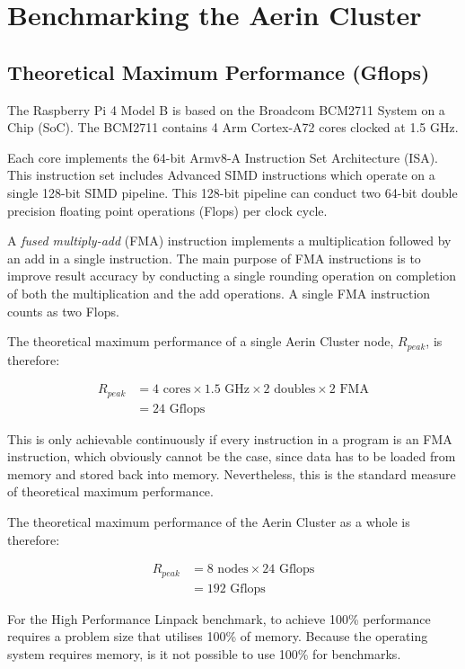 \documentclass{report}
\begin{document}
%
%
\chapter{Benchmarking the Aerin Cluster}

%
%
\section{Theoretical Maximum Performance (Gflops)}

The Raspberry Pi 4 Model B is based on the Broadcom BCM2711 System on a Chip (SoC). The BCM2711 contains 4 Arm Cortex-A72 cores clocked at 1.5 GHz.

Each core implements the 64-bit Armv8-A Instruction Set Architecture (ISA). This instruction set includes Advanced SIMD instructions which operate on a single 128-bit SIMD pipeline. This 128-bit pipeline can conduct two 64-bit double precision floating point operations (Flops) per clock cycle.  

A \emph{fused multiply-add} (FMA) instruction implements a multiplication followed by an add in a single instruction. The main purpose of FMA instructions is to improve result accuracy by conducting a single rounding operation on completion of both the multiplication and the add operations. A single FMA instruction counts as two Flops. 

The theoretical maximum performance of a single Aerin Cluster node, $R_{peak}$, is therefore:

\begin{align}
R_{peak} &= 4 \textrm{ cores} \times 1.5 \textrm{ GHz} \times 2 \textrm{ doubles} \times 2 \textrm{ FMA}\\
&= 24 \textrm{ Gflops}
\end{align}

This is only achievable continuously if every instruction in a program is an FMA instruction, which obviously cannot be the case, since data has to be loaded from memory and stored back into memory. Nevertheless, this is the standard measure of theoretical maximum performance.

The theoretical maximum performance of the Aerin Cluster as a whole is therefore:

\begin{align}
R_{peak} &= 8 \textrm{ nodes} \times 24 \textrm{ Gflops}\\
&= 192 \textrm{ Gflops}
\end{align}

For the High Performance Linpack benchmark, to achieve 100\% performance requires a problem size that utilises 100\% of memory. Because the operating system requires memory, is it not possible to use 100\% for benchmarks.
\end{document}
